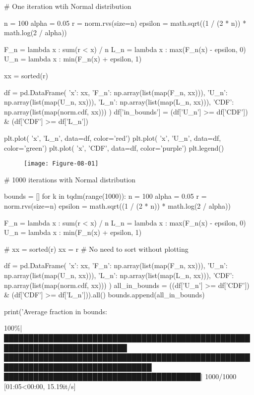 \begin{python}
# One iteration wtih Normal distribution

n = 100
alpha = 0.05
r = norm.rvs(size=n)
epsilon = math.sqrt((1 / (2 * n)) * math.log(2 / alpha))

F_{n} = lambda x : sum(r < x) / n
L_{n} = lambda x : max(F_{n}(x) - epsilon, 0)
U_{n} = lambda x : min(F_{n}(x) + epsilon, 1)

xx = sorted(r)

df = pd.DataFrame({
    'x': xx, 
    'F_{n}': np.array(list(map(F_{n}, xx))), 
    'U_{n}': np.array(list(map(U_{n}, xx))), 
    'L_{n}': np.array(list(map(L_{n}, xx))), 
    'CDF': np.array(list(map(norm.cdf, xx)))
})
df['in_bounds'] = (df['U_{n}'] >= df['CDF']) & (df['CDF'] >= df['L_{n}'])

plt.plot( 'x', 'L_{n}', data=df, color='red')
plt.plot( 'x', 'U_{n}', data=df, color='green')
plt.plot( 'x', 'CDF', data=df, color='purple')
plt.legend()
\end{python}

\begin{figure}[H]
\centering
\texttt{[image: Figure-08-01]}
\end{figure}
    
\begin{python}
# 1000 iterations with Normal distribution

bounds = []
for k in tqdm(range(1000)):
    n = 100
    alpha = 0.05
    r = norm.rvs(size=n)
    epsilon = math.sqrt((1 / (2 * n)) * math.log(2 / alpha))

    F_{n} = lambda x : sum(r < x) / n
    L_{n} = lambda x : max(F_{n}(x) - epsilon, 0)
    U_{n} = lambda x : min(F_{n}(x) + epsilon, 1)

    # xx = sorted(r)
    xx = r # No need to sort without plotting
    
    df = pd.DataFrame({
        'x': xx, 
        'F_{n}': np.array(list(map(F_{n}, xx))), 
        'U_{n}': np.array(list(map(U_{n}, xx))), 
        'L_{n}': np.array(list(map(L_{n}, xx))), 
        'CDF': np.array(list(map(norm.cdf, xx)))
    })
    all_{i}n_bounds = ((df['U_{n}'] >= df['CDF']) & (df['CDF'] >= df['L_{n}'])).all()
    bounds.append(all_{i}n_bounds)
    
print('Average fraction in bounds: %
\end{python}

\begin{console}
100\%|███████████████████████████████████████████████████████████████████████████
████████████████████████████████████████████████████████████████████████████████
████████████████████████████████████████| 1000/1000 [01:05<00:00, 15.19it/s]
\end{console}

